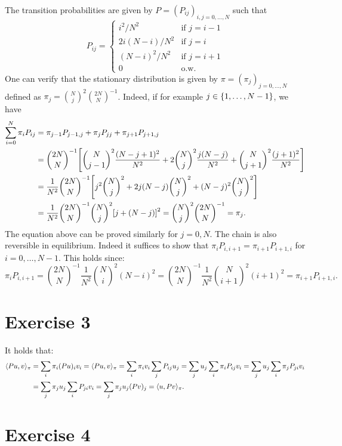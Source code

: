 \documentclass[a4paper,11pt]{article}
\theoremstyle{definition}
\theoremstyle{plain}
\theoremstyle{remark}
\DeclarePairedDelimiter{\parq}{[}{]}
\DeclarePairedDelimiter{\bra}{\lbrace}{\rbrace}
\DeclarePairedDelimiter{\prodscal}{\langle}{\rangle}
\begin{document}
The transition probabilities are given by $P = (P_{ij})_{i,j=0,\dots,N}$ such that
$$
P_{ij} = \left\lbrace\begin{array}{ll}
i^2/N^2 & \text{if } j=i-1 \\
2i(N-i)/N^2 & \text{if } j=i \\
(N-i)^2/N^2 & \text{if } j=i+1 \\
0 & \text{o.w.}
\end{array}
\right.
$$
One can verify that the stationary distribution is given by $\pi=(\pi_j)_{j=0,\dots,N}$ defined as $\pi_j=\binom{N}{j}^2\binom{2N}{N}^{-1}$. Indeed, if for example $j\in\bra{1,\dots,N-1}$, we have
\begin{align*}
\sum_{i=0}^N\pi_iP_{ij} & = \pi_{j-1}P_{j-1,j} + \pi_jP_{jj} + \pi_{j+1}P_{j+1,j} \\ & = \binom{2N}{N}^{-1}\parq*{\binom{N}{j-1}^2\frac{(N-j+1)^2}{N^2} + 2\binom{N}{j}^2\frac{j(N-j)}{N^2} + \binom{N}{j+1}^2\frac{(j+1)^2}{N^2}} \\ & = \frac{1}{N^2}\binom{2N}{N}^{-1}\parq*{j^2\binom{N}{j}^2+2j(N-j)\binom{N}{j}^2+(N-j)^2\binom{N}{j}^2} \\ & = \frac{1}{N^2}\binom{2N}{N}^{-1}\binom{N}{j}^2\parq*{j+(N-j)}^2 = \binom{N}{j}^2\binom{2N}{N}^{-1} = \pi_j.
\end{align*}
The equation above can be proved similarly for $j=0,N$. The chain is also reversible in equilibrium. Indeed it suffices to show that $\pi_iP_{i,i+1}=\pi_{i+1}P_{i+1,i}$ for $i=0,\dots,N-1$. This holds since:
$$
\pi_iP_{i,i+1} = \binom{2N}{N}^{-1}\frac{1}{N^2}\binom{N}{i}^2(N-i)^2 = \binom{2N}{N}^{-1}\frac{1}{N^2}\binom{N}{i+1}^2(i+1)^2 = \pi_{i+1}P_{i+1,i}.
$$ 

\section*{Exercise 3}

It holds that:
\begin{align*}
\prodscal{Pu,v}_\pi & = \sum_i\pi_i(Pu)_iv_i = \prodscal{Pu,v}_\pi = \sum_i\pi_iv_i\sum_jP_{ij}u_j = \sum_ju_j\sum_i\pi_iP_{ij}v_i = \sum_ju_j\sum_i\pi_jP_{ji}v_i \\ & = \sum_j\pi_ju_j\sum_iP_{ji}v_i = \sum_j\pi_ju_j(Pv)_j = \prodscal{u,Pv}_\pi.
\end{align*}

\section*{Exercise 4}
\end{document}
